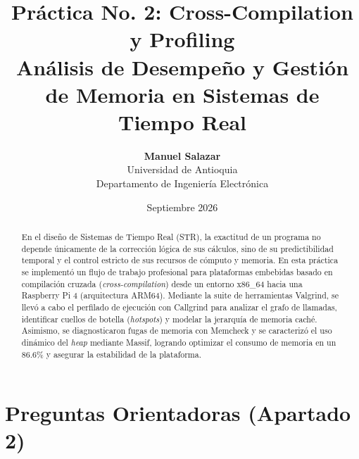 \documentclass[11pt,a4paper]{article}
\title{\textbf{Práctica No. 2: Cross-Compilation y Profiling} \\ 
\large Análisis de Desempeño y Gestión de Memoria en Sistemas de Tiempo Real}
\author{\textbf{Manuel Salazar} \\ Universidad de Antioquia \\ Departamento de Ingeniería Electrónica}
\date{Septiembre 2026}
\begin{document}
\maketitle

\begin{abstract}
En el diseño de Sistemas de Tiempo Real (STR), la exactitud de un programa no depende únicamente de la corrección lógica de sus cálculos, sino de su predictibilidad temporal y el control estricto de sus recursos de cómputo y memoria. En esta práctica se implementó un flujo de trabajo profesional para plataformas embebidas basado en compilación cruzada (\textit{cross-compilation}) desde un entorno x86\_64 hacia una Raspberry Pi 4 (arquitectura ARM64). Mediante la suite de herramientas Valgrind, se llevó a cabo el perfilado de ejecución con Callgrind para analizar el grafo de llamadas, identificar cuellos de botella (\textit{hotspots}) y modelar la jerarquía de memoria caché. Asimismo, se diagnosticaron fugas de memoria con Memcheck y se caracterizó el uso dinámico del \textit{heap} mediante Massif, logrando optimizar el consumo de memoria en un 86.6\% y asegurar la estabilidad de la plataforma.
\end{abstract}

\tableofcontents
\newpage

\section{Preguntas Orientadoras (Apartado 2)}
\end{document}
